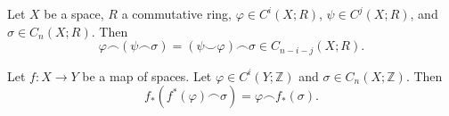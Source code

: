 
\begin{theorem}
    Let $X$ be a space, $R$ a commutative ring, $\varphi \in C^i(X;R)$, $\psi \in C^j(X;R)$, and $\sigma \in C_n(X;R)$. Then
    \[ \varphi \frown (\psi \frown \sigma) = (\psi \smile \varphi) \frown \sigma \in C_{n-i-j}(X; R). \]
\end{theorem}

\begin{theorem}
    Let $f: X \to Y$ be a map of spaces. Let $\varphi \in C^i(Y; \mathbb Z)$ and $\sigma \in C_n(X; \mathbb Z)$. Then
    \[ f_*(f^*(\varphi) \frown \sigma) = \varphi \frown f_*(\sigma). \]
\end{theorem}